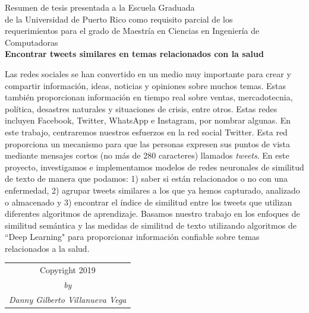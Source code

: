 \documentclass[12pt]{report}
\begin{document}
	\begin{center}
		Resumen de tesis presentada a la Escuela Graduada\\
		de la Universidad de Puerto Rico como requisito parcial de los\\
		requerimientos para el grado de Maestr\'ia en Ciencias en Ingenier\'ia de Computadoras\\
		
		\vspace{.1cm}
		\large\textbf {Encontrar tweets similares en temas relacionados con la salud}
	\end{center}
	\doublespacing
Las redes sociales se han convertido en un medio muy importante para crear y compartir informaci\'on, ideas, noticias y opiniones sobre muchos temas. Estas tambi\'en proporcionan informaci\'on en tiempo real sobre ventas, mercadotecnia, pol\'itica, desastres naturales y situaciones de crisis, entre otros. Estas redes incluyen Facebook, Twitter, WhatsApp e Instagram, por nombrar algunas. En este trabajo, centraremos nuestros esfuerzos en la red social Twitter. Esta red proporciona un mecanismo para que las personas expresen sus puntos de vista mediante mensajes cortos (no m\'as de 280 caracteres)
llamados {\em tweets}. En este proyecto, investigamos e implementamos modelos de redes neuronales de similitud de texto de manera que podamos: 1) saber si est\'an relacionados o no con una enfermedad, 2) agrupar tweets similares a los que ya hemos capturado, analizado o almacenado y 3) encontrar el \'indice de similitud entre los tweets que utilizan diferentes algoritmos de aprendizaje. Basamos nuestro trabajo en los enfoques de similitud sem\'antica y las medidas de similitud de texto utilizando algoritmos de ``Deep Learning" para proporcionar informaci\'on confiable sobre temas relacionados a la salud.

	\par
	\clearpage
	
	\vspace*{\fill}
	\begin{table}[H]
		\centering
		\begin{adjustbox}{max width=\textwidth }
			\begin{tabular}{c}
				Copyright \textcopyright\hspace{0.15cm}2019 \\
				\textit{by}\\
				\textit{Danny Gilberto Villanueva Vega}\\
			\end{tabular}
		\end{adjustbox} 
	\end{table}
	\vfill
	\clearpage
	
\end{document}
